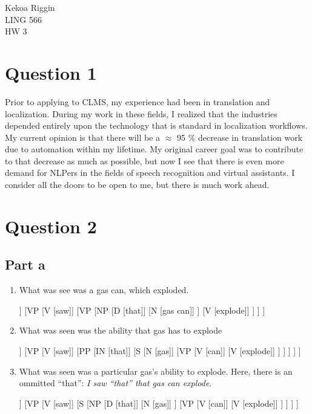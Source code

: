 \documentclass[11pt]{article}
\begin{document}
\noindent
Kekoa Riggin\\
LING 566\\
HW 3

\section*{Question 1}
\noindent
Prior to applying to CLMS, my experience had been in translation and localization. During my work in these fields, I realized that the industries depended entirely upon the technology that is standard in localization workflows. My current opinion is that there will be a $\approx$ 95 \% decrease in translation work due to automation within my lifetime. My original career goal was to contribute to that decrease as much as possible, but now I see that there is even more demand for NLPers in the fields of speech recognition and virtual assistants. I consider all the doors to be open to me, but there is much work ahead. 

\section*{Question 2}

\subsection*{Part a}
\noindent
\begin{enumerate}
\item
What was see was a gas can, which exploded.

\begin{forest}
	[S
		[N [I]]
		[VP 
			[V [saw]]
			[VP
				[NP
					[D [that]]
					[N [gas can]]
				]
				[V [explode]]
			]
		]
	]
\end{forest}

\item 
What was seen was the ability that gas has to explode

\begin{forest}
	[S
		[N [I]]
		[VP 
			[V [saw]]
			[PP
				[IN [that]]
				[S
					[N [gas]]
					[VP 
						[V [can]]
						[V [explode]]
					]
				]
			]
		]
	]
\end{forest}

\item
What was seen was a particular gas's ability to explode. Here, there is an ommitted ``that'': \textit{I saw ``that'' that gas can explode}.

\begin{forest}
	[S
		[N [I]]
		[VP 
			[V [saw]]
			[S
				[NP
					[D [that]]
					[N [gas]]
				]					
				[VP
					[V [can]]
					[V [explode]]
				]
			]
		]
	]
\end{forest}

\end{enumerate}
\end{document}
